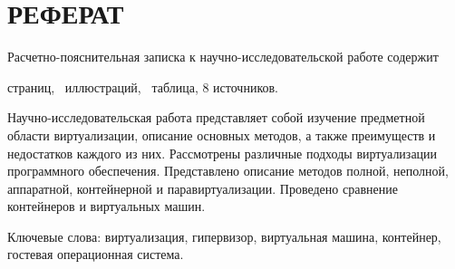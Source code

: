 

 

\setcounter{page}{3}

\chapter*{РЕФЕРАТ}
Расчетно-пояснительная записка к научно-исследовательской работе содержит  \begin{NoHyper}\pageref{LastPage}\end{NoHyper} страниц, \totfig~иллюстраций, \tottab~таблица, 8 источников.

Научно-исследовательская работа представляет собой изучение предметной области виртуализации, описание основных методов, а также преимуществ и недостатков каждого из них. Рассмотрены различные подходы виртуализации программного обеспечения. Представлено описание методов полной, неполной, аппаратной, контейнерной и паравиртуализации. Проведено сравнение контейнеров и виртуальных машин.

Ключевые слова: виртуализация, гипервизор, виртуальная машина, контейнер, гостевая операционная система.
